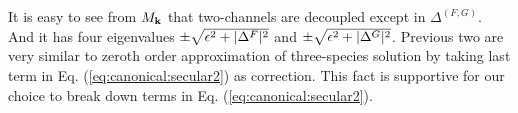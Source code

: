 It is easy to see from $M_{\mathbf{k}}$ that two-channels are decoupled except in $\Delta^{(F,G)}$.  And it has four eigenvalues  $\pm\sqrt{\epsilon^{2}+\lvert{\Delta^{F}}\rvert^{2}}$ and $\pm\sqrt{\epsilon^{2}+\lvert{\Delta^{G}}\rvert^{2}}$.  Previous two are very similar to zeroth order approximation of three-species solution by taking last term in Eq. (\ref{eq:canonical:secular2}) as correction.  This fact is supportive for our choice to break down terms in Eq. (\ref{eq:canonical:secular2}).